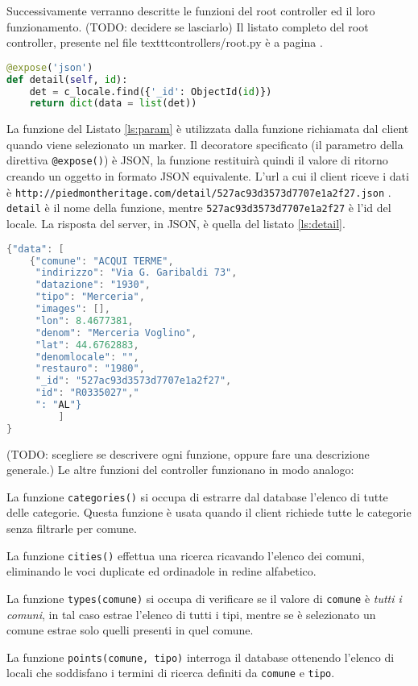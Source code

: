 Successivamente verranno descritte le funzioni del root controller ed il loro funzionamento.
(TODO: decidere se lasciarlo) Il listato completo del root controller, presente nel file texttt{controllers/root.py} è a pagina \pageref{ls:completo}.

\begin{lstlisting}[label=ls:param,caption={Funzione utilizzata per richiedere i dettagli su un locale con ID=\texttt{id}},language=Python]
@expose('json')
def detail(self, id):
    det = c_locale.find({'_id': ObjectId(id)})
    return dict(data = list(det))
\end{lstlisting}

La funzione del Listato \ref{ls:param} è utilizzata dalla funzione richiamata dal client quando viene selezionato un marker. Il decoratore specificato (il parametro della direttiva \texttt{@expose()}) è JSON, la funzione restituirà quindi il valore di ritorno creando un oggetto in formato JSON equivalente. L'url a cui il client riceve i dati è \texttt{http://piedmontheritage.com/detail/527ac93d3573d7707e1a2f27.json} . \texttt{detail} è il nome della funzione, mentre \texttt{527ac93d3573d7707e1a2f27} è l'id del locale. La risposta del server, in JSON, è quella del listato \ref{ls:detail}.

\begin{lstlisting}[label=ls:detail,caption={Dati in formato JSON restituiti dal server.},language=c]
{"data": [
	{"comune": "ACQUI TERME",
	 "indirizzo": "Via G. Garibaldi 73",
	 "datazione": "1930",
	 "tipo": "Merceria",
	 "images": [],
	 "lon": 8.4677381,
	 "denom": "Merceria Voglino",
	 "lat": 44.6762883,
	 "denomlocale": "",
	 "restauro": "1980",
	 "_id": "527ac93d3573d7707e1a2f27",
	 "id": "R0335027","
	 ": "AL"}
	     ]
}
\end{lstlisting}

(TODO: scegliere se descrivere ogni funzione, oppure fare una descrizione generale.)
Le altre funzioni del controller funzionano in modo analogo:

La funzione \texttt{categories()} si occupa di estrarre dal database l'elenco di tutte delle categorie. Questa funzione è usata quando il client richiede tutte le categorie senza filtrarle per comune.

La funzione \texttt{cities()} effettua una ricerca ricavando l'elenco dei comuni, eliminando le voci duplicate ed ordinadole in redine alfabetico.

La funzione \texttt{types(comune)} si occupa di verificare se il valore di \texttt{comune} è \emph{tutti i comuni}, in tal caso estrae l'elenco di tutti i tipi, mentre se è selezionato un comune estrae solo quelli presenti in quel comune.

La funzione \texttt{points(comune, tipo)} interroga il database ottenendo l'elenco di locali che soddisfano i termini di ricerca definiti da \texttt{comune} e \texttt{tipo}.





